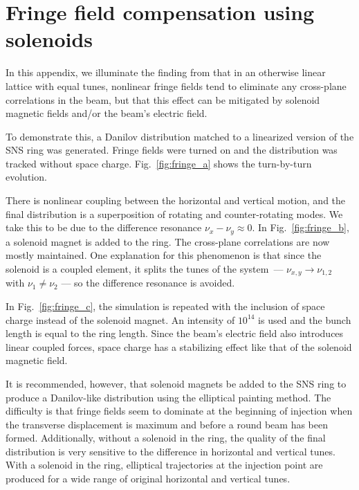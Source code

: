 \chapter{Fringe field compensation using solenoids} \label{app-C}

In this appendix, we illuminate the finding from \cite{Holmes2018} that in an otherwise linear lattice with equal tunes, nonlinear fringe fields tend to eliminate any cross-plane correlations in the beam, but that this effect can be mitigated by solenoid magnetic fields and/or the beam's electric field.

To demonstrate this, a Danilov distribution matched to a linearized version of the SNS ring was generated. Fringe fields were turned on and the distribution was tracked without space charge. Fig.~\ref{fig:fringe_a} shows the turn-by-turn evolution.

There is nonlinear coupling between the horizontal and vertical motion, and the final distribution is a superposition of rotating and counter-rotating modes. We take this to be due to the difference resonance $\nu_x - \nu_y \approx 0$. In Fig.~\ref{fig:fringe_b}, a solenoid magnet is added to the ring. The cross-plane correlations are now mostly maintained. One explanation for this phenomenon is that since the solenoid is a coupled element, it splits the tunes of the system — $\nu_{x, y} \rightarrow \nu_{1, 2}$ with $\nu_1 \ne \nu_2$ — so the difference resonance is avoided.

In Fig.~\ref{fig:fringe_c}, the simulation is repeated with the inclusion of space charge instead of the solenoid magnet. An intensity of $10^{14}$ is used and the bunch length is equal to the ring length. Since the beam's electric field also introduces linear coupled forces, space charge has a stabilizing effect like that of the solenoid magnetic field.

It is recommended, however, that solenoid magnets be added to the SNS ring to produce a Danilov-like distribution using the elliptical painting method. The difficulty is that fringe fields seem to dominate at the beginning of injection when the transverse displacement is maximum and before a round beam has been formed. Additionally, without a solenoid in the ring, the quality of the final distribution is very sensitive to the difference in horizontal and vertical tunes. With a solenoid in the ring, elliptical trajectories at the injection point are produced for a wide range of original horizontal and vertical tunes. 



